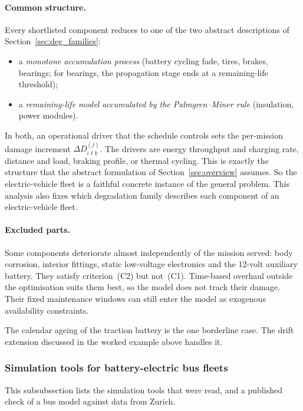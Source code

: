 \documentclass[11pt,a4paper]{article}
\theoremstyle{plain}
\theoremstyle{definition}
\theoremstyle{remark}
\begin{document}
\paragraph{Common structure.}
Every shortlisted component reduces to one of the two abstract descriptions of Section~\ref{sec:deg_families}:
\begin{itemize}
  \item a \emph{monotone accumulation process} (battery cycling fade, tires, brakes, bearings; for bearings, the propagation stage ends at a remaining-life threshold);
  \item a \emph{remaining-life model accumulated by the Palmgren--Miner rule} (insulation, power modules).
\end{itemize}
In both, an operational driver that the schedule controls sets the per-mission damage increment $\Delta D^{(j)}_{i\ell k}$.
The drivers are energy throughput and charging rate, distance and load, braking profile, or thermal cycling.
This is exactly the structure that the abstract formulation of Section~\ref{sec:overview} assumes.
So the electric-vehicle fleet is a faithful concrete instance of the general problem.
This analysis also fixes which degradation family describes each component of an electric-vehicle fleet.

\paragraph{Excluded parts.}
Some components deteriorate almost independently of the mission served: body corrosion, interior fittings, static low-voltage electronics and the 12-volt auxiliary battery.
They satisfy criterion~(C2) but not~(C1).
Time-based overhaul outside the optimisation suits them best, so the model does not track their damage.
Their fixed maintenance windows can still enter the model as exogenous availability constraints.

The calendar ageing of the traction battery is the one borderline case.
The drift extension discussed in the worked example above handles it.

\subsubsection{Simulation tools for battery-electric bus fleets}
\label{sec:sim_tools}

This subsubsection lists the simulation tools that were read, and a published check of a bus model against data from Zurich.
\end{document}
